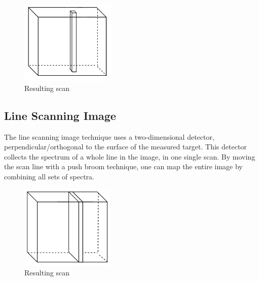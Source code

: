 \begin{figure}[H]
\centering
  \includegraphics[height=4cm]{Images/theory/voxel.png}
  \caption{Resulting scan}
  \label{fig:voxel2}
\end{figure}


\subsection{Line Scanning Image} \label{sec:push}
The line scanning image technique uses a two-dimensional detector, perpendicular/orthogonal to the surface of the measured target. This detector collects the spectrum of a whole line in the image, in one single scan. By moving the scan line with a push broom technique, one can map the entire image by combining all sets of spectra.


\begin{figure}[H]
\centering
  \includegraphics[height=4cm]{Images/theory/pushbroom.png}
  \caption{ Resulting scan}
  \label{fig:pushbroom}
\end{figure}

